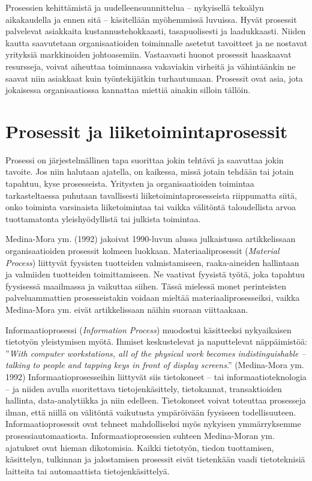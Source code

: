 \documentclass[
  finnish,
  letterpaper,
  DIV=11,
  numbers=noendperiod,
  oneside]{scrreprt}
\begin{document}
Prosessien kehittämistä ja uudelleensuunnittelua -- nykyisellä tekoälyn
aikakaudella ja ennen sitä -- käsitellään myöhemmissä luvuissa. Hyvät
prosessit palvelevat asiakkaita kustannustehokkaasti, tasapuolisesti ja
laadukkaasti. Niiden kautta saavutetaan organisaatioiden toiminnalle
asetetut tavoitteet ja ne nostavat yrityksiä markkinoiden johtoasemiin.
Vastaavasti huonot prosessit haaskaavat resursseja, voivat aiheuttaa
toiminnassa vakaviakin virheitä ja vähintäänkin ne saavat niin asiakkaat
kuin työntekijätkin turhautumaan. Prosessit ovat asia, jota jokaisessa
organisaatiossa kannattaa miettiä ainakin silloin tällöin.


\chapter{Prosessit ja
liiketoimintaprosessit}\label{prosessit-ja-liiketoimintaprosessit}

Prosessi on järjestelmällinen tapa suorittaa jokin tehtävä ja saavuttaa
jokin tavoite. Jos niin halutaan ajatella, on kaikessa, missä jotain
tehdään tai jotain tapahtuu, kyse prosesseista. Yritysten ja
organisaatioiden toimintaa tarkasteltaessa puhutaan tavallisesti
liiketoimintaprosesseista riippumatta siitä, onko toiminta varsinaista
liiketoimintaa tai vaikka välitöntä taloudellista arvoa tuottamatonta
yleishyödyllistä tai julkista toimintaa.

Medina-Mora ym. (1992) jakoivat 1990-luvun alussa julkaistussa
artikkelissaan organisaatioiden prosessit kolmeen luokkaan.
Materiaaliprosessit (\emph{Material Process}) liittyvät fyysisten
tuotteiden valmistamiseen, raaka-aineiden hallintaan ja valmiiden
tuotteiden toimittamiseen. Ne vaativat fyysistä työtä, joka tapahtuu
fyysisessä maailmassa ja vaikuttaa siihen. Tässä mielessä monet
perinteisten palveluammattien prosesseistakin voidaan mieltää
materiaaliprosesseiksi, vaikka Medina-Mora ym. eivät artikkelissaan
näihin suoraan viittaakaan.

Informaatioprosessi (\emph{Information Process}) muodostui käsitteeksi
nykyaikaisen tietotyön yleistymisen myötä. Ihmiset keskustelevat ja
naputtelevat näppäimistöä: ''\emph{With computer workstations, all of
the physical work becomes indistinguishable -- talking to people and
tapping keys in front of display screens}.'' (Medina-Mora ym. 1992)
Informaatioprosesseihin liittyvät siis tietokoneet -- tai
informaatioteknologia -- ja niiden avulla suoritettava
tietojenkäsittely, tietokannat, transaktioiden hallinta,
data-analytiikka ja niin edelleen. Tietokoneet voivat toteuttaa
prosesseja ilman, että niillä on välitöntä vaikutusta ympäröivään
fyysiseen todellisuuteen. Informaatioprosessit ovat tehneet
mahdolliseksi myös nykyisen ymmärryksemme prosessiautomaatiosta.
Informaatioprosessien suhteen Medina-Moran ym. ajatukset ovat hieman
dikotomisia. Kaikki tietotyön, tiedon tuottamisen, käsittelyn, tulkinnan
ja jalostamisen prosessit eivät tietenkään vaadi tietoteknisiä laitteita
tai automaattista tietojenkäsittelyä.
\end{document}
